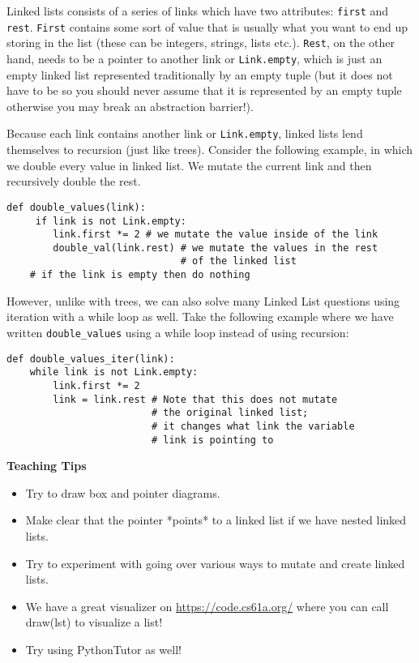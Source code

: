 \begin{blocksection}
Linked lists consists of a series of links which have two attributes: \lstinline{first} and \lstinline{rest}. \lstinline{First} contains some sort of value that is usually what you want to end up storing in the list (these can be integers, strings, lists etc.). \lstinline{Rest}, on the other hand, needs to be a pointer to another link or \lstinline{Link.empty}, which is just an empty linked list represented traditionally by an empty tuple (but it does not have to be so you should never assume that it is represented by an empty tuple otherwise you may break an abstraction barrier!).

Because each link contains another link or \lstinline{Link.empty}, linked lists lend themselves to recursion (just like trees). Consider the following example, in which we double every value in linked list. We mutate the current link and then recursively double the rest. 
\vspace{1.5mm}
\begin{lstlisting}
def double_values(link): 
     if link is not Link.empty:
        link.first *= 2 # we mutate the value inside of the link
        double_val(link.rest) # we mutate the values in the rest 
                              # of the linked list
    # if the link is empty then do nothing
\end{lstlisting}

However, unlike with trees, we can also solve many Linked List questions using iteration with a while loop as well. Take the following example where we have written \lstinline{double_values} using a while loop instead of using recursion:
\vspace{1.5mm}
\begin{lstlisting}
def double_values_iter(link):
    while link is not Link.empty:
        link.first *= 2
        link = link.rest # Note that this does not mutate 
                         # the original linked list; 
                         # it changes what link the variable 
                         # link is pointing to
\end{lstlisting}
\end{blocksection}

\begin{guide}
    \textbf{Teaching Tips}
    \begin{itemize}
       \item Try to draw box and pointer diagrams.
       \item Make clear that the pointer *points* to a linked list if we have nested linked lists.
       \item Try to experiment with going over various ways to mutate and create linked lists. 
       \item We have a great visualizer on \url{https://code.cs61a.org/} where you can call draw(lst) to visualize a list! 
       \item Try using PythonTutor as well!
    \end{itemize}
 \end{guide}